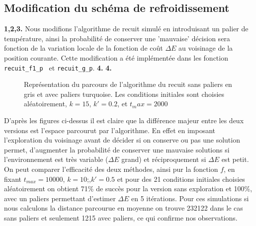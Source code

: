 \documentclass[12pt]{article}
\begin{document}
\subsection{Modification du schéma de refroidissement}
\textbf{\color{brick}1,2,3.}
Nous modifions l'algorithme de recuit simulé en introduisant un palier de température, ainsi la probabilité de conserver une 'mauvaise' décision sera fonction de la variation locale de la fonction de coût $\Delta E$ au voisinage de la position courante. Cette modification a été implémentée dans les fonction \verb|recuit_f1_p | et \verb|recuit_g_p|.
\textbf{\color{brick}4.}
\textbf{\color{brick}4.}
\begin{figure}[H]
  \centering
  \caption{Représentation du parcours de l'algorithme du recuit sans paliers en gris et avec paliers turquoise. Les conditions initiales sont choisies aléatoirement,  $k =15$, $k'=0.2$, et $t_max= 2000$}
  \label{fig:ab}
\end{figure}
D'après les figures ci-dessus il est claire que la différence majeur entre les deux versions est l'espace parcourut par l'algorithme. En effet en imposant l'exploration du voisinage avant de décider si on conserve ou pas une solution permet, d'augmenter la probabilité de conserver une mauvaise solutions si l'environnement est très variable ($\Delta E$ grand) et réciproquement si $\Delta E$ est petit. \\
On peut comparer l'efficacité des deux méthodes, ainsi pur la fonction $f$, en fixant $t_{max}=10000$, $k=10$;,$k'=0.5$ et pour des 21 conditions initiales choisies aléatoirement on obtient 71\% de succès pour la version sans exploration et 100\%, avec un paliers permettant d'estimer $\Delta E$ en 5 itérations. Pour ces simulations si nous calculons la distance parcourue en moyenne on trouve 232122 dans le cas sans paliers et seulement 1215 avec paliers, ce qui confirme nos observations.\\
\end{document}
